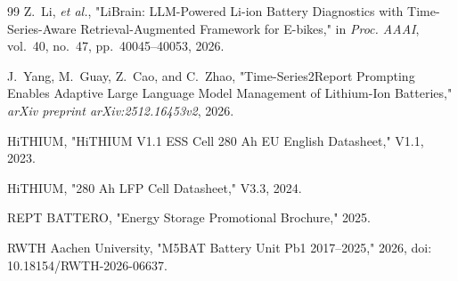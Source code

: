 \begin{thebibliography}{99}
Z.~Li, \emph{et al.},
"LiBrain: LLM-Powered Li-ion Battery Diagnostics with Time-Series-Aware Retrieval-Augmented Framework for E-bikes,"
in \emph{Proc. AAAI}, vol.~40, no.~47, pp.~40045--40053, 2026.

J.~Yang, M.~Guay, Z.~Cao, and C.~Zhao,
"Time-Series2Report Prompting Enables Adaptive Large Language Model Management of Lithium-Ion Batteries,"
\emph{arXiv preprint arXiv:2512.16453v2}, 2026.

HiTHIUM, "HiTHIUM V1.1 ESS Cell 280 Ah EU English Datasheet," V1.1, 2023.

HiTHIUM, "280 Ah LFP Cell Datasheet," V3.3, 2024.

REPT BATTERO, "Energy Storage Promotional Brochure," 2025.

RWTH Aachen University, "M5BAT Battery Unit Pb1 2017--2025," 2026,
doi: 10.18154/RWTH-2026-06637.

\end{thebibliography}
